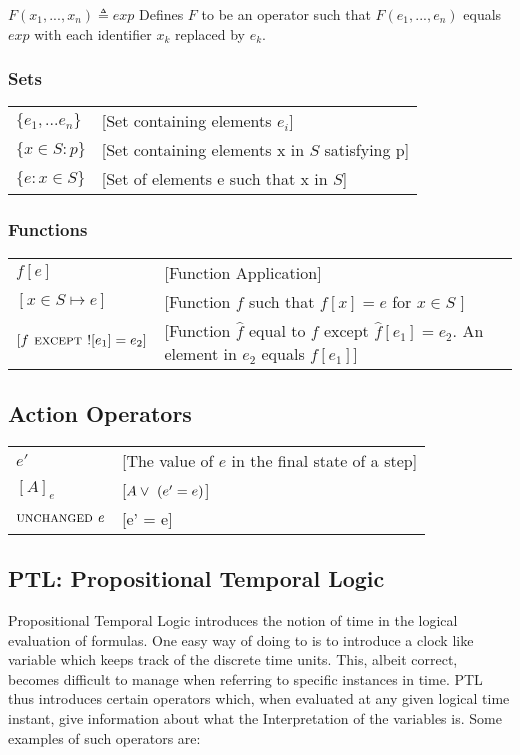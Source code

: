 \documentclass[fleqn]{tukseminar}
\begin{document}
			$F(x_1,...,x_n) \triangleq exp$ Defines $F$ to be an operator such that $F(e_1,...,e_n)$ equals $exp$ with each identifier $x_k$ replaced by $e_k$. 
			
			\subsubsection*{Sets}
			\begin{tabular}{ l l }
				$\{e_1,...e_n\}$ & [Set containing elements $e_i$]\\
				$\{ x \in S: p\}$ & [Set containing elements x in $S$ satisfying p]\\
				$\{e : x \in S\}$ & [Set of elements e such that x in $S$]\\
			\end{tabular}
		
		\subsubsection*{Functions}
		\begin{tabular}{ l l }
			$f[e]$ & [Function Application]\\
			$[x \in S \mapsto e]$ & [Function $f$ such that $f[x]=e$ for $x\in S$ ]\\
			$[f \mbox{\textsc{ except }} ![e_1]=e_2]$ & [Function $\widehat f$ equal to $f$ except $\widehat f[e_1] = e_2$. An element in $e_2$ equals $f[e_1]$]\\
		\end{tabular}
	
	\subsection*{Action Operators}
	\begin{tabular}{ l l }
		$e'$ & [The value of $e$ in the final state of a step]\\
		$[A]_e$ & [$A \lor \  (e'=e)$]\\
		$\mbox{\textsc{unchanged }} e$ & [e' = e]\\
	\end{tabular}
			
			\subsection*{PTL: Propositional Temporal Logic} \label{ptldefinition}
			Propositional Temporal Logic\cite{kroger} introduces the notion of time in the logical evaluation of formulas. One easy way of doing to is to introduce a clock like variable which keeps track of the discrete time units. This, albeit correct, becomes difficult to manage when referring to specific instances in time. PTL thus introduces certain operators which, when evaluated at any given logical time instant, give information about what the Interpretation of the variables is. Some examples of such operators are:
			
\end{document}
